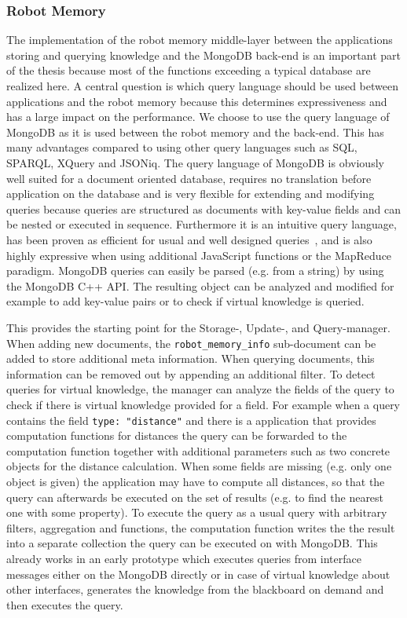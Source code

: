\documentclass[a4paper,11pt]{article}
\begin{document}
\subsubsection{Robot Memory}
\label{sec:impl-memory}
The implementation of the robot memory middle-layer between the
applications storing and querying knowledge and the MongoDB back-end
is an important part of the thesis because most of the functions
exceeding a typical database are realized here. A central question is
which query language should be used between applications and the robot
memory because this determines expressiveness and has a large impact
on the performance. We choose to use the query language of MongoDB as
it is used between the robot memory and the back-end. This has many
advantages compared to using other query languages such as SQL,
SPARQL, XQuery and JSONiq. The query language of MongoDB is obviously
well suited for a document oriented database, requires no translation
before application on the database and is very flexible for extending
and modifying queries because queries are structured as documents with
key-value fields and can be nested or executed in
sequence. Furthermore it is an intuitive query language, has been
proven as efficient for usual and well designed
queries~\cite{mongodb,RoboDB}, and is also highly expressive when
using additional JavaScript functions or the MapReduce
paradigm. MongoDB queries can easily be parsed (e.g. from a string) by
using the MongoDB C++ API. The resulting object can be analyzed and
modified for example to add key-value pairs or to check if virtual
knowledge is queried.

This provides the starting point for the Storage-, Update-, and
Query-manager. When adding new documents, the
\texttt{robot\_memory\_info} sub-document can be added to store
additional meta information. When querying documents, this information
can be removed out by appending an additional filter. To detect
queries for virtual knowledge, the manager can analyze the fields of
the query to check if there is virtual knowledge provided for a
field. For example when a query contains the field \texttt{type:
  "distance"} and there is a application that provides computation
functions for distances the query can be forwarded to the computation
function together with additional parameters such as two concrete
objects for the distance calculation. When some fields are missing
(e.g. only one object is given) the application may have to compute
all distances, so that the query can afterwards be executed on the set
of results (e.g. to find the nearest one with some property). To
execute the query as a usual query with arbitrary filters, aggregation
and functions, the computation function writes the the result into a
separate collection the query can be executed on with MongoDB. This
already works in an early prototype which executes queries from
interface messages either on the MongoDB directly or in case of
virtual knowledge about other interfaces, generates the knowledge from
the blackboard on demand and then executes the query.
\end{document}
